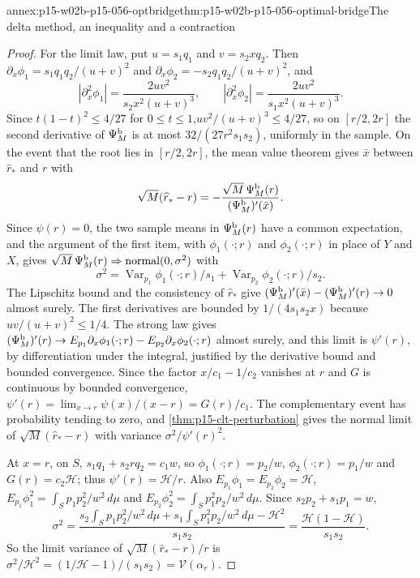 \begin{annexitem}{annex:p15-w02b-p15-056-optbridge}{thm:p15-w02b-p15-056-optimal-bridge}{The delta method, an inequality and a contraction}
\begin{proof}
For the limit law, put \(u=s_1q_1\) and \(v=s_2xq_2\). Then
\(\partial_x\phi_1=s_1q_1q_2/(u+v)^2\) and
\(\partial_x\phi_2=-s_2q_1q_2/(u+v)^2\), and
\[
 |\partial_x^2\phi_1|=\frac{2uv^2}{s_2x^2(u+v)^3},\qquad
 |\partial_x^2\phi_2|=\frac{2uv^2}{s_1x^2(u+v)^3}.
\]
Since \(t(1-t)^2\leq4/27\) for \(0\leq t\leq1\),\(uv^2/(u+v)^3\leq4/27\), so on
\([r/2,2r]\) the second derivative of \(\Psi^{\rm b}_M\) is at most
\(32/(27r^2s_1s_2)\), uniformly in the sample. On the event that the
root lies in \([r/2,2r]\), the mean value theorem gives \(\bar x\) between
\(\widehat r_*\) and \(r\) with
\[
 \sqrt M(\widehat r_*-r)
 =-\frac{\sqrt M\,\Psi^{\rm b}_M(r)}{(\Psi^{\rm b}_M)'(\bar x)} .
\]
Since \(\psi(r)=0\), the two sample means in \(\Psi^{\rm b}_M(r)\) have a
common expectation, and the argument of the first item, with
\(\phi_1(\cdot;r)\) and \(\phi_2(\cdot;r)\) in place of \(Y\) and \(X\),
gives \(\sqrt M\,\Psi^{\rm b}_M(r)\Rightarrow\operatorname{normal}(0,\sigma^2)\)
with
\[
 \sigma^2=\operatorname{Var}_{p_1}\phi_1(\cdot;r)/s_1
 +\operatorname{Var}_{p_2}\phi_2(\cdot;r)/s_2 .
\]
The Lipschitz bound and
the consistency of \(\widehat r_*\) give
\((\Psi^{\rm b}_M)'(\bar x)-(\Psi^{\rm b}_M)'(r)\to0\) almost surely. The
first derivatives are bounded by \(1/(4s_1s_2x)\) because
\(uv/(u+v)^2\leq1/4\). The strong law gives
\((\Psi^{\rm b}_M)'(r)\to E_{p_1}\partial_x\phi_1(\cdot;r)
-E_{p_2}\partial_x\phi_2(\cdot;r)\) almost surely, and this limit is
\(\psi'(r)\), by differentiation under the integral, justified by the
derivative bound and bounded convergence. Since the factor
\(x/c_1-1/c_2\) vanishes at \(r\) and \(G\) is continuous by bounded
convergence, \(\psi'(r)=\lim_{x\to r}\psi(x)/(x-r)=G(r)/c_1\). The complementary event has probability tending to
zero, and \cref{thm:p15-clt-perturbation} gives the normal limit of
\(\sqrt M(\widehat r_*-r)\) with variance \(\sigma^2/\psi'(r)^2\).

At \(x=r\), on \(S\), \(s_1q_1+s_2rq_2=c_1w\), so
\(\phi_1(\cdot;r)=p_2/w\), \(\phi_2(\cdot;r)=p_1/w\) and
\(G(r)=c_2\mathcal H\); thus \(\psi'(r)=\mathcal H/r\). Also
\(E_{p_1}\phi_1=E_{p_2}\phi_2=\mathcal H\),
\(E_{p_1}\phi_1^2=\int_Sp_1p_2^2/w^2\,d\mu\) and
\(E_{p_2}\phi_2^2=\int_Sp_1^2p_2/w^2\,d\mu\). Since
\(s_2p_2+s_1p_1=w\),
\[
 \sigma^2=\frac{s_2\int_Sp_1p_2^2/w^2\,d\mu+s_1\int_Sp_1^2p_2/w^2\,d\mu
 -\mathcal H^2}{s_1s_2}
 =\frac{\mathcal H(1-\mathcal H)}{s_1s_2} .
\]
So the limit variance of \(\sqrt M(\widehat r_*-r)/r\) is
\(\sigma^2/\mathcal H^2=(1/\mathcal H-1)/(s_1s_2)=\mathcal V(\alpha_r)\).
\end{proof}
\end{annexitem}

